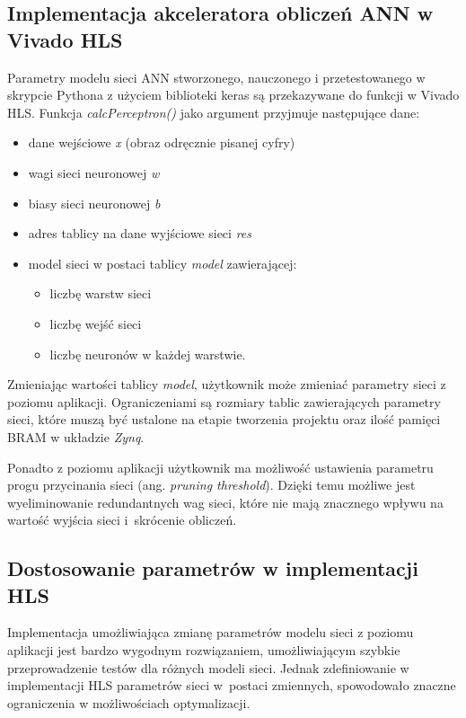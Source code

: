 \subsection{Implementacja akceleratora obliczeń ANN w Vivado HLS}
  Parametry modelu sieci ANN stworzonego, nauczonego i przetestowanego w skrypcie Pythona z użyciem biblioteki keras są przekazywane do funkcji w Vivado HLS. Funkcja \emph{calcPerceptron()} jako argument przyjmuje następujące dane:
  \begin{itemize}
    \item dane wejściowe \emph{x} (obraz odręcznie pisanej cyfry)
    \item wagi sieci neuronowej \emph{w}
    \item biasy sieci neuronowej \emph{b}
    \item adres tablicy na dane wyjściowe sieci \emph{res}
    \item model sieci w postaci tablicy \emph{model} zawierającej:
    \begin{itemize}
      \item liczbę warstw sieci
      \item liczbę wejść sieci
      \item liczbę neuronów w każdej warstwie.
    \end{itemize}
  \end{itemize}

Zmieniając wartości tablicy \emph{model}, użytkownik może zmieniać parametry sieci z poziomu 
aplikacji. Ograniczeniami są rozmiary tablic zawierających parametry sieci, które muszą być 
ustalone na etapie tworzenia projektu oraz ilość pamięci BRAM w układzie \emph{Zynq}.
   
Ponadto z poziomu aplikacji użytkownik ma możliwość ustawienia parametru progu przycinania sieci 
(ang. \emph{pruning threshold}). Dzięki temu możliwe jest wyeliminowanie redundantnych wag sieci, które nie mają znacznego wpływu na wartość wyjścia sieci i~skrócenie obliczeń.

\subsection{Dostosowanie parametrów w implementacji HLS}

Implementacja umożliwiająca zmianę parametrów modelu sieci z poziomu aplikacji jest bardzo wygodnym 
rozwiązaniem, umożliwiającym szybkie przeprowadzenie testów dla różnych modeli sieci. Jednak 
zdefiniowanie w implementacji HLS parametrów sieci w~postaci zmiennych, spowodowało znaczne 
ograniczenia w możliwościach optymalizacji. 

